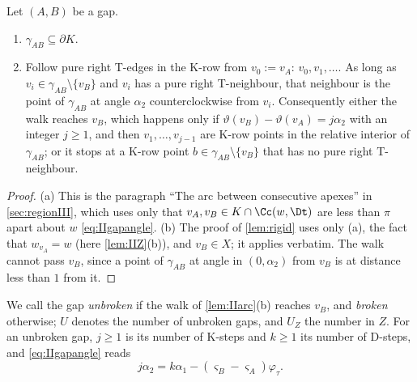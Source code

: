 \begin{lemma}\label{lem:IIarc}
Let $(A,B)$ be a gap.
\begin{enumerate}[label=\textup{(\alph*)}]
\item $\gamma_{AB}\subseteq\partial K$.
\item Follow pure right T-edges in the K-row from $v_0:=v_A$: $v_0,v_1,\dots$. As long as $v_i\in\gamma_{AB}\setminus\{v_B\}$ and $v_i$ has a pure right T-neighbour, that neighbour is the point of $\gamma_{AB}$ at angle $\alpha_2$ counterclockwise from $v_i$. Consequently either the walk reaches $v_B$, which happens only if $\vartheta(v_B)-\vartheta(v_A)=j\alpha_2$ with an integer $j\ge1$, and then $v_1,\dots,v_{j-1}$ are K-row points in the relative interior of $\gamma_{AB}$; or it stops at a K-row point $b\in\gamma_{AB}\setminus\{v_B\}$ that has no pure right T-neighbour.
\end{enumerate}
\end{lemma}
\begin{proof}
(a) This is the paragraph ``The arc between consecutive apexes'' in \cref{sec:regionIII}, which uses only that $v_A,v_B\in K\cap\Cc(w,\Dt)$ are less than $\pi$ apart about $w$ \eqref{eq:IIgapangle}. (b) The proof of \cref{lem:rigid} uses only (a), the fact that $w_{v_A}=w$ (here \cref{lem:IIZ}(b)), and $v_B\in X$; it applies verbatim. The walk cannot pass $v_B$, since a point of $\gamma_{AB}$ at angle in $(0,\alpha_2)$ from $v_B$ is at distance less than $1$ from it.
\end{proof}

We call the gap \emph{unbroken} if the walk of \cref{lem:IIarc}(b) reaches $v_B$, and \emph{broken} otherwise; $U$ denotes the number of unbroken gaps, and $U_Z$ the number in $Z$. For an unbroken gap, $j\ge1$ is its number of K-steps and $k\ge1$ its number of D-steps, and \eqref{eq:IIgapangle} reads
\begin{equation}\label{eq:IIstar}
j\alpha_2=k\alpha_1-(\varsigma_B-\varsigma_A)\varphi_\tau .
\end{equation}


